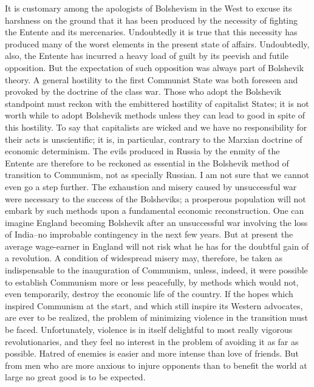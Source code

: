 It is customary among the apologists of Bolshevism in the West to excuse its harshness on the ground that it has been produced by the necessity of fighting the Entente and its mercenaries. Undoubtedly it is true that this necessity has produced many of the worst elements in the present state of affairs. Undoubtedly, also, the Entente has incurred a heavy load of guilt by its peevish and futile opposition. But the expectation of such opposition was always part of Bolshevik theory. A general hostility to the first Communist State was both foreseen and provoked by the doctrine of the class war. Those who adopt the Bolshevik standpoint must reckon with the embittered hostility of capitalist States; it is not worth while to adopt Bolshevik methods unless they can lead to good in spite of this hostility. To say that capitalists are wicked and we have no responsibility for their acts is unscientific; it is, in particular, contrary to the Marxian doctrine of economic determinism. The evils produced in Russia by the enmity of the Entente are therefore to be reckoned as essential in the Bolshevik method of transition to Communism, not as specially Russian. I am not sure that we cannot even go a step further. The exhaustion and misery caused by unsuccessful war were necessary to the success of the Bolsheviks; a prosperous population will not embark by such methods upon a fundamental economic reconstruction. One can imagine England becoming Bolshevik after an unsuccessful war involving the loss of India--no improbable contingency in the next few years. But at present the average wage-earner in England will not risk what he has for the doubtful gain of a revolution. A condition of widespread misery may, therefore, be taken as indispensable to the inauguration of Communism, unless, indeed, it were possible to establish Communism more or less peacefully, by methods which would not, even temporarily, destroy the economic life of the country. If the hopes which inspired Communism at the start, and which still inspire its Western advocates, are ever to be realized, the problem of minimizing violence in the transition must be faced. Unfortunately, violence is in itself delightful to most really vigorous revolutionaries, and they feel no interest in the problem of avoiding it as far as possible. Hatred of enemies is easier and more intense than love of friends. But from men who are more anxious to injure opponents than to benefit the world at large no great good is to be expected.